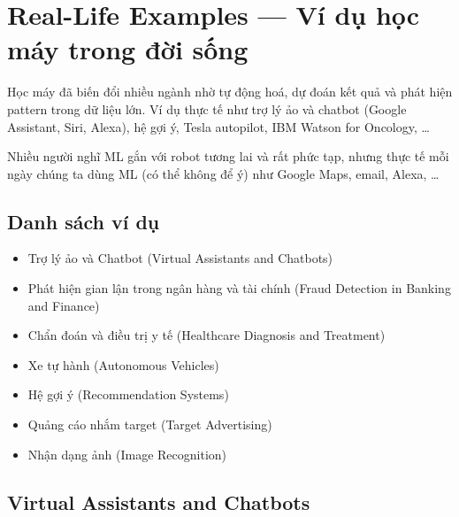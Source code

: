 \section{Real-Life Examples --- Ví dụ học máy trong đời sống}

\begin{dongco}[title={ML không xa lạ như ta nghĩ}]
Học máy đã biến đổi nhiều ngành nhờ tự động hoá, dự đoán kết quả và phát hiện pattern trong dữ liệu lớn.
Ví dụ thực tế như trợ lý ảo và chatbot (Google Assistant, Siri, Alexa), hệ gợi ý, Tesla autopilot, IBM Watson for Oncology, \ldots
\end{dongco}

\begin{ynghia}[title={ML trong đời sống hằng ngày}]
Nhiều người nghĩ ML gắn với robot tương lai và rất phức tạp, nhưng thực tế mỗi ngày chúng ta dùng ML (có thể không để ý) như Google Maps, email, Alexa, \ldots
\end{ynghia}

\subsection{Danh sách ví dụ}

\begin{phuongphap}[title={Các ví dụ tiêu biểu}]
\begin{itemize}
  \item Trợ lý ảo và Chatbot (Virtual Assistants and Chatbots)
  \item Phát hiện gian lận trong ngân hàng và tài chính (Fraud Detection in Banking and Finance)
  \item Chẩn đoán và điều trị y tế (Healthcare Diagnosis and Treatment)
  \item Xe tự hành (Autonomous Vehicles)
  \item Hệ gợi ý (Recommendation Systems)
  \item Quảng cáo nhắm target (Target Advertising)
  \item Nhận dạng ảnh (Image Recognition)
\end{itemize}
\end{phuongphap}

\subsection{Virtual Assistants and Chatbots}

